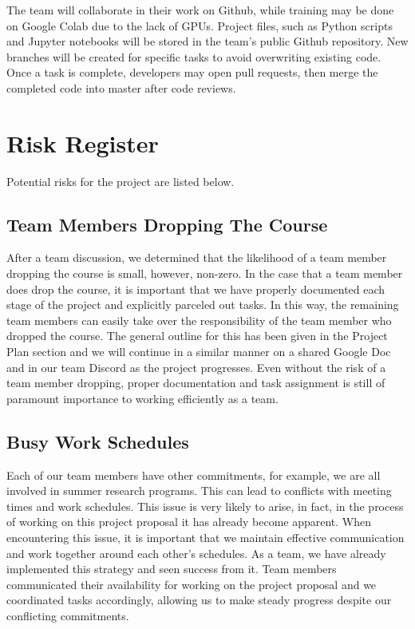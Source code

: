 \documentclass{article} %
\begin{document}
The team will collaborate in their work on Github, while training may be done on Google Colab due to the lack of GPUs. Project files, such as Python scripts and Jupyter notebooks will be stored in the team's public Github repository. New branches will be created for specific tasks to avoid overwriting existing code. Once a task is complete, developers may open pull requests, then merge the completed code into master after code reviews.

\clearpage
\section{Risk Register}

Potential risks for the project are listed below.

\subsection{Team Members Dropping The Course}

After a team discussion, we determined that the likelihood of a team member dropping the course is small, however, non-zero. In the case that a team member does drop the course, it is important that we have properly documented each stage of the project and explicitly parceled out tasks. In this way, the remaining team members can easily take over the responsibility of the team member who dropped the course. The general outline for this has been given in the Project Plan section and we will continue in a similar manner on a shared Google Doc and in our team Discord as the project progresses. Even without the risk of a team member dropping, proper documentation and task assignment is still of paramount importance to working efficiently as a team.

\subsection{Busy Work Schedules}

Each of our team members have other commitments, for example, we are all involved in summer research programs. This can lead to conflicts with meeting times and work schedules. This issue is very likely to arise, in fact, in the process of working on this project proposal it has already become apparent. When encountering this issue, it is important that we maintain effective communication and work together around each other's schedules. As a team, we have already implemented this strategy and seen success from it. Team members communicated their availability for working on the project proposal and we coordinated tasks accordingly, allowing us to make steady progress despite our conflicting commitments.
\end{document}
